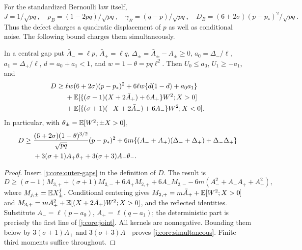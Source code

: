For the standardized Bernoulli law itself,
\[
 J=1/\sqrt{pq},\quad \rho_B=(1-2pq)/\sqrt{pq},\quad
 \gamma_B=(q-p)/\sqrt{pq},\quad
 D_B=(6+2\sigma)(p-p_*)^2/\sqrt{pq}.
\]
Thus the defect charges a quadratic displacement of $p$ as well as
conditional noise. The following bound charges them simultaneously.

\begin{lemma}\label{j:core:joint-defect}
In a central gap put $\bar A_-=\ell p$, $\bar A_+=\ell q$,
$\Delta_\pm=\bar A_\pm-A_\pm\ge0$,
$a_0=\Delta_-/\ell$, $a_1=\Delta_+/\ell$, $d=a_0+a_1<1$, and
$w=1-\theta=pq\ell^2$. Then $U_0\le a_0$, $U_1\ge-a_1$, and
\begin{align}
 D\ge{}&\ell w(6+2\sigma)(p-p_*)^2
 +6\ell w\{d(1-d)+a_0a_1\}\notag\\
 &+\mathbb E[\{(\sigma-1)(X+2\bar A_+)+6A_+\}W^2;X>0]\notag\\
 &+\mathbb E[\{(\sigma+1)(-X+2\bar A_-)+6A_-\}W^2;X<0].\label{j:core:joint}
\end{align}
In particular, with $\theta_\pm=\mathbb E[W^2;\pm X>0]$,
\begin{align}
 D\ge{}&\frac{(6+2\sigma)(1-\theta)^{3/2}}{\sqrt{pq}}(p-p_*)^2
 +6m\{(A_-+A_+)(\Delta_-+\Delta_+)+\Delta_-\Delta_+\}\notag\\
 &+3(\sigma+1)A_+\theta_++3(\sigma+3)A_-\theta_-.\label{j:core:simultaneous}
\end{align}
\end{lemma}
\begin{proof}
Insert \eqref{j:core:outer-gaps} in the definition of $D$. The result is
\[
 D\ge(\sigma-1)M_{3,+}+(\sigma+1)M_{3,-}
 +6A_+M_{2,+}+6A_-M_{2,-}-6m(A_-^2+A_-A_++A_+^2),
\]
where $M_{j,\pm}=\mathbb E X_\pm^j$. Conditional centering gives
$M_{2,+}=m\bar A_++\mathbb E[W^2;X>0]$ and
$M_{3,+}=m\bar A_+^2+\mathbb E[(X+2\bar A_+)W^2;X>0]$,
and the reflected identities. Substitute $A_-=\ell(p-a_0)$,
$A_+=\ell(q-a_1)$; the deterministic part is precisely the first line
of \eqref{j:core:joint}. All kernels are nonnegative. Bounding them
below by $3(\sigma+1)A_+$ and $3(\sigma+3)A_-$ proves
\eqref{j:core:simultaneous}. Finite third moments suffice throughout.
\end{proof}

